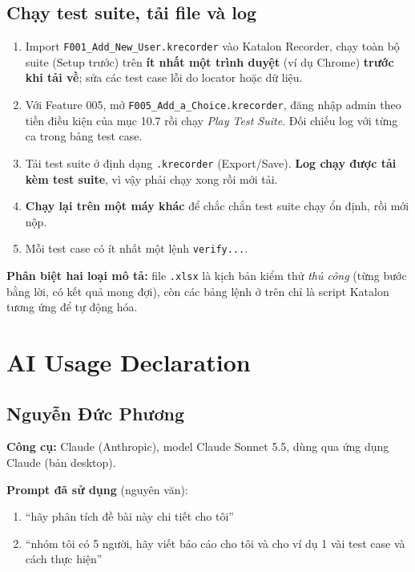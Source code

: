 \documentclass[12pt,a4paper]{article}
\begin{document}
\subsection{Chạy test suite, tải file và log}
\begin{enumerate}[noitemsep]
  \item Import \texttt{F001\_Add\_New\_User.krecorder} vào Katalon Recorder, chạy toàn bộ suite (Setup trước) trên
        \textbf{ít nhất một trình duyệt} (ví dụ Chrome) \textbf{trước khi tải về}; sửa các test case lỗi do locator hoặc dữ liệu.
  \item Với Feature 005, mở \texttt{F005\_Add\_a\_Choice.krecorder}, đăng nhập admin theo tiền điều kiện của mục 10.7 rồi chạy \textit{Play Test Suite}. Đối chiếu log với từng ca trong bảng test case.
  \item Tải test suite ở định dạng \texttt{.krecorder} (Export/Save). \textbf{Log chạy được tải kèm test suite}, vì vậy phải chạy xong rồi mới tải.
  \item \textbf{Chạy lại trên một máy khác} để chắc chắn test suite chạy ổn định, rồi mới nộp.
  \item Mỗi test case có ít nhất một lệnh \texttt{verify...}.
\end{enumerate}
\textbf{Phân biệt hai loại mô tả:} file \texttt{.xlsx} là kịch bản kiểm thử \emph{thủ công} (từng bước bằng lời, có kết quả mong đợi),
còn các bảng lệnh ở trên chỉ là script Katalon tương ứng để tự động hóa.


\section{AI Usage Declaration}

\subsection{Nguyễn Đức Phương}
\textbf{Công cụ:} Claude (Anthropic), model Claude Sonnet 5.5, dùng qua ứng dụng Claude (bản desktop).

\noindent\textbf{Prompt đã sử dụng} (nguyên văn):
\begin{enumerate}[noitemsep]
  \item ``hãy phân tích đề bài này chi tiết cho tôi''
  \item ``nhóm tôi có 5 người, hãy viết báo cáo cho tôi và cho ví dụ 1 vài test case và cách thực hiện''
\end{enumerate}
\end{document}
